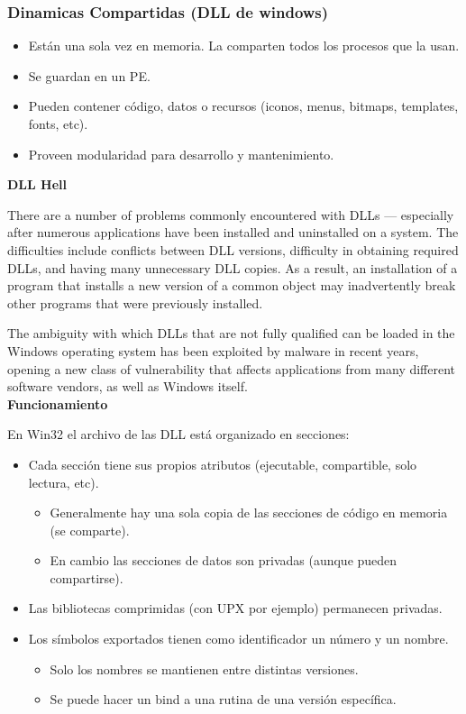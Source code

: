 \documentclass[a4paper, twoside]{article}
\begin{document}
\subsubsection{Dinamicas Compartidas (DLL de windows)}

\begin{itemize}
  \item Están una sola vez en memoria. La comparten todos los procesos que la
  usan.
  \item Se guardan en un PE.
  \item Pueden contener código, datos o recursos (iconos, menus, bitmaps,
  templates, fonts, etc).
  \item Proveen modularidad para desarrollo y mantenimiento.
\end{itemize}

\textbf{DLL Hell}

There are a number of problems commonly encountered with DLLs --- especially
after numerous applications have been installed and uninstalled on a system.
The difficulties include conflicts between DLL versions, difficulty in
obtaining required DLLs, and having many unnecessary DLL copies.
As a result, an installation of a program that installs a new version of a
common object may inadvertently break other programs that were previously
installed.

The ambiguity with which DLLs that are not fully qualified can be loaded in the
Windows operating system has been exploited by malware in recent years, opening
a new class of vulnerability that affects applications from many different
software vendors, as well as Windows itself.\\

\textbf{Funcionamiento}

En Win32 el archivo de las DLL está organizado en secciones:
\begin{itemize}
  \item Cada sección tiene sus propios atributos (ejecutable, compartible,
  solo lectura, etc).
  \begin{itemize}
    \item Generalmente hay una sola copia de las secciones de código en memoria
    (se comparte).
    \item En cambio las secciones de datos son privadas (aunque pueden
    compartirse).
  \end{itemize}
  \item Las bibliotecas comprimidas (con UPX por ejemplo) permanecen privadas.
  \item Los símbolos exportados tienen como identificador un número y un nombre.
  \begin{itemize}
    \item Solo los nombres se mantienen entre distintas versiones.
    \item Se puede hacer un bind a una rutina de una versión específica.
  \end{itemize}
\end{itemize}
\end{document}
